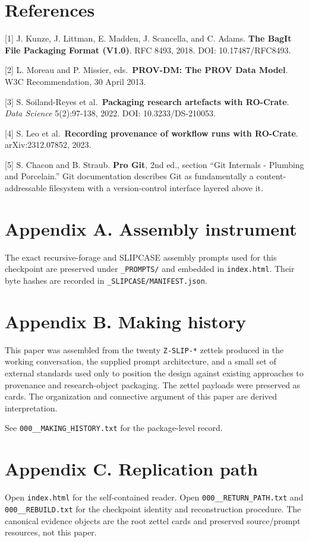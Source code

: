 \documentclass[
  11pt,
]{article}
\begin{document}
\section{References}\label{references}

{[}1{]} J. Kunze, J. Littman, E. Madden, J. Scancella, and C. Adams.
\textbf{The BagIt File Packaging Format (V1.0)}. RFC 8493, 2018. DOI:
10.17487/RFC8493.

{[}2{]} L. Moreau and P. Missier, eds.~\textbf{PROV-DM: The PROV Data
Model}. W3C Recommendation, 30 April 2013.

{[}3{]} S. Soiland-Reyes et al.~\textbf{Packaging research artefacts
with RO-Crate}. \emph{Data Science} 5(2):97-138, 2022. DOI:
10.3233/DS-210053.

{[}4{]} S. Leo et al.~\textbf{Recording provenance of workflow runs with
RO-Crate}. arXiv:2312.07852, 2023.

{[}5{]} S. Chacon and B. Straub. \textbf{Pro Git}, 2nd ed., section
``Git Internals - Plumbing and Porcelain.'' Git documentation describes
Git as fundamentally a content-addressable filesystem with a
version-control interface layered above it.

\section{Appendix A. Assembly
instrument}\label{appendix-a.-assembly-instrument}

The exact recursive-forage and SLIPCASE assembly prompts used for this
checkpoint are preserved under \texttt{\_PROMPTS/} and embedded in
\texttt{index.html}. Their byte hashes are recorded in
\texttt{\_SLIPCASE/MANIFEST.json}.

\section{Appendix B. Making history}\label{appendix-b.-making-history}

This paper was assembled from the twenty \texttt{Z-SLIP-*} zettels
produced in the working conversation, the supplied prompt architecture,
and a small set of external standards used only to position the design
against existing approaches to provenance and research-object packaging.
The zettel payloads were preserved as cards. The organization and
connective argument of this paper are derived interpretation.

See \texttt{000\_\_MAKING\_HISTORY.txt} for the package-level record.

\section{Appendix C. Replication
path}\label{appendix-c.-replication-path}

Open \texttt{index.html} for the self-contained reader. Open
\texttt{000\_\_RETURN\_PATH.txt} and \texttt{000\_\_REBUILD.txt} for the
checkpoint identity and reconstruction procedure. The canonical evidence
objects are the root zettel cards and preserved source/prompt resources,
not this paper.
\end{document}
